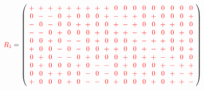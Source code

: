 \documentclass{beamer}
\newcommand{\RR}[1]{\textcolor{red}{#1}}
\begin{document}
\begin{frame}

  \[
    \RR{R_1} =
    \left(
      \arraycolsep=3.0pt\def\arraystretch{1.0}
      \begin{array}{cccccccccccccccccc}
        \RR{+}&\RR{+}&\RR{+}&\RR{+}&\RR{+}&\RR{+}&\RR{+}&\RR{+}&\RR{+}&\RR{0}&\RR{0}&\RR{0}&\RR{0}&\RR{0}&\RR{0}&\RR{0}&\RR{0}&\RR{0}\\
        \RR{0}&\RR{-}&\RR{-}&\RR{0}&\RR{+}&\RR{0}&\RR{0}&\RR{0}&\RR{+}&\RR{-}&\RR{+}&\RR{+}&\RR{0}&\RR{+}&\RR{0}&\RR{0}&\RR{0}&\RR{+}\\
        \RR{-}&\RR{0}&\RR{-}&\RR{0}&\RR{0}&\RR{+}&\RR{+}&\RR{0}&\RR{0}&\RR{+}&\RR{-}&\RR{+}&\RR{0}&\RR{0}&\RR{+}&\RR{+}&\RR{0}&\RR{0}\\
        \RR{-}&\RR{-}&\RR{0}&\RR{+}&\RR{0}&\RR{0}&\RR{0}&\RR{+}&\RR{0}&\RR{+}&\RR{+}&\RR{-}&\RR{+}&\RR{0}&\RR{0}&\RR{0}&\RR{+}&\RR{0}\\
        \RR{0}&\RR{0}&\RR{+}&\RR{0}&\RR{-}&\RR{-}&\RR{0}&\RR{+}&\RR{0}&\RR{0}&\RR{0}&\RR{+}&\RR{-}&\RR{+}&\RR{+}&\RR{0}&\RR{+}&\RR{0}\\
        \RR{+}&\RR{0}&\RR{0}&\RR{-}&\RR{0}&\RR{-}&\RR{0}&\RR{0}&\RR{+}&\RR{+}&\RR{0}&\RR{0}&\RR{+}&\RR{-}&\RR{+}&\RR{0}&\RR{0}&\RR{+}\\
        \RR{0}&\RR{+}&\RR{0}&\RR{-}&\RR{-}&\RR{0}&\RR{+}&\RR{0}&\RR{0}&\RR{0}&\RR{+}&\RR{0}&\RR{+}&\RR{+}&\RR{-}&\RR{+}&\RR{0}&\RR{0}\\
        \RR{0}&\RR{+}&\RR{0}&\RR{0}&\RR{0}&\RR{+}&\RR{0}&\RR{-}&\RR{-}&\RR{0}&\RR{+}&\RR{0}&\RR{0}&\RR{0}&\RR{+}&\RR{-}&\RR{+}&\RR{+}\\
        \RR{0}&\RR{0}&\RR{+}&\RR{+}&\RR{0}&\RR{0}&\RR{-}&\RR{0}&\RR{-}&\RR{0}&\RR{0}&\RR{+}&\RR{+}&\RR{0}&\RR{0}&\RR{+}&\RR{-}&\RR{+}\\
        \RR{+}&\RR{0}&\RR{0}&\RR{0}&\RR{+}&\RR{0}&\RR{-}&\RR{-}&\RR{0}&\RR{+}&\RR{0}&\RR{0}&\RR{0}&\RR{+}&\RR{0}&\RR{+}&\RR{+}&\RR{-}\\
      \end{array}
    \right)
  \]
  
\end{frame}
\end{document}
